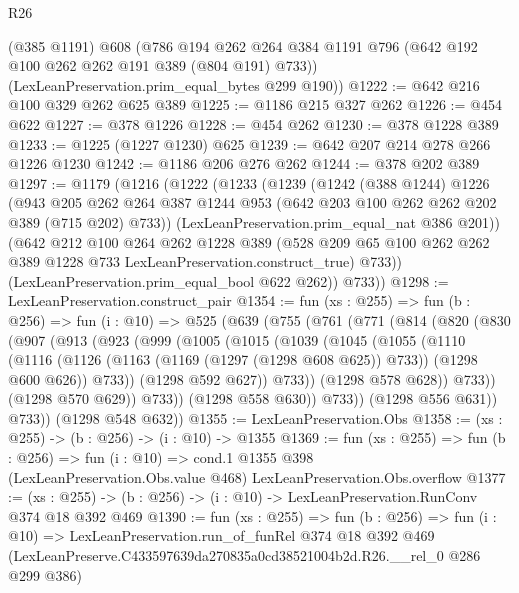 \begin{lexlean}{R26}
\begin{coremodule}
      (@385 @1191)
      @608
      (@786 @194 @262 @264 @384 @1191 @796 (@642 @192 @100 @262 @262 @191 @389 (@804 @191) @733))
      (LexLeanPreservation.prim_equal_bytes @299 @190))
@1222 := @642 @216 @100 @329 @262 @625 @389
@1225 := @1186 @215 @327 @262
@1226 := @454 @622
@1227 := @378 @1226
@1228 := @454 @262
@1230 := @378 @1228 @389
@1233 := @1225 (@1227 @1230) @625
@1239 := @642 @207 @214 @278 @266 @1226 @1230
@1242 := @1186 @206 @276 @262
@1244 := @378 @202 @389
@1297 := @1179
    (@1216
      (@1222
        (@1233
          (@1239
            (@1242
              (@388 @1244)
              @1226
              (@943
                @205
                @262
                @264
                @387
                @1244
                @953
                (@642 @203 @100 @262 @262 @202 @389 (@715 @202) @733))
              (LexLeanPreservation.prim_equal_nat @386 @201))
            (@642
              @212
              @100
              @264
              @262
              @1228
              @389
              (@528 @209 @65 @100 @262 @262 @389 @1228 @733 LexLeanPreservation.construct_true)
              @733))
          (LexLeanPreservation.prim_equal_bool @622 @262))
        @733))
@1298 := LexLeanPreservation.construct_pair
@1354 := fun (xs : @255) =>
  fun (b : @256) =>
  fun (i : @10) =>
  @525
    (@639
      (@755
        (@761
          (@771
            (@814
              (@820
                (@830
                  (@907
                    (@913
                      (@923
                        (@999
                          (@1005
                            (@1015
                              (@1039
                                (@1045
                                  (@1055
                                    (@1110
                                      (@1116
                                        (@1126
                                          (@1163 (@1169 (@1297 (@1298 @608 @625)) @733))
                                          (@1298 @600 @626))
                                        @733))
                                    (@1298 @592 @627))
                                  @733))
                              (@1298 @578 @628))
                            @733))
                        (@1298 @570 @629))
                      @733))
                  (@1298 @558 @630))
                @733))
            (@1298 @556 @631))
          @733))
      (@1298 @548 @632))
@1355 := LexLeanPreservation.Obs
@1358 := (xs : @255) -> (b : @256) -> (i : @10) -> @1355
@1369 := fun (xs : @255) =>
  fun (b : @256) =>
  fun (i : @10) =>
  cond.{1} @1355 @398 (LexLeanPreservation.Obs.value @468) LexLeanPreservation.Obs.overflow
@1377 := (xs : @255) -> (b : @256) -> (i : @10) -> LexLeanPreservation.RunConv @374 @18 @392 @469
@1390 := fun (xs : @255) =>
  fun (b : @256) =>
  fun (i : @10) =>
  LexLeanPreservation.run_of_funRel
    @374
    @18
    @392
    @469
    (LexLeanPreserve.C433597639da270835a0cd38521004b2d.R26.__rel_0 @286 @299 @386)
\end{coremodule}
\end{lexlean}
